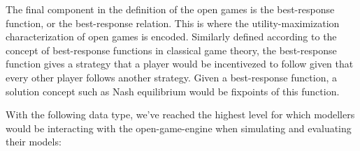 \documentclass[11pt,titlepage,dvipsnames,table,xcdraw,english]{article}
\newcommand{\Conid}[1]{\mathit{#1}}
\newcommand{\Varid}[1]{\mathit{#1}}
\def\resethooks{%
  \global\let\SaveRestoreHook\empty
  \global\let\ColumnHook\empty}
\newcommand{\hsindent}[1]{\quad}%
\let\hspre\empty
\let\hspost\empty
\renewcommand{\Conid}[1]{{\color{funcColor}{#1}}}
\renewcommand{\Varid}[1]{{\color{typeColor}{#1}}}
\begin{document}
The final component in the definition of the open games is the best-response function, or the best-response relation. This is where the utility-maximization characterization of open games is encoded. Similarly defined according to the concept of best-response functions in classical game theory, the best-response function gives a strategy that a player would be incentivezed to follow given that every other player follows another strategy. Given a best-response function, a solution concept such as Nash equilibrium would be fixpoints of this function. 



With the following data type, we've reached the highest level for which modellers would be interacting with the open-game-engine when simulating and evaluating their models:  

\begin{minipage}\textwidth
   \resethooks
\end{minipage}
\end{document}

